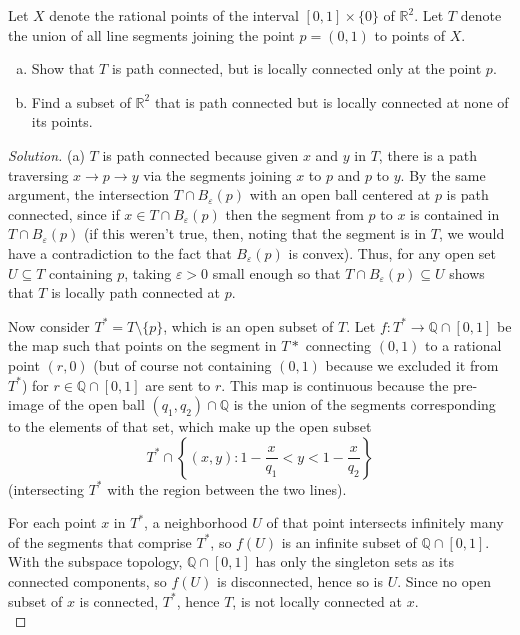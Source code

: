 \documentclass[10pt]{article}
\providecommand{\eps}{\varepsilon}
\providecommand{\QQ}{\mathbb Q}
\providecommand{\RR}{\mathbb R}
\providecommand{\ii}{\item}
\newenvironment{soln}{\begin{proof}[Solution]}{\end{proof}}
\begin{document}
\pagebreak

\begin{problem}
    [Munkres 25.5]
    Let $X$ denote the rational points of the interval $[0,1]\times\{0\}$ of $\RR^2$.
    Let $T$ denote the union of all line segments joining the point $p=(0,1)$
    to points of $X$.
    \begin{enumerate}[(a)]
        \ii Show that $T$ is path connected,
	but is locally connected only at the point $p$.
	\ii Find a subset of $\RR^2$ that is path connected
	but is locally connected at none of its points.
    \end{enumerate}
\end{problem}

\begin{soln}
    (a) $T$ is path connected because
    given $x$ and $y$ in $T$, there is a path traversing $x\to p\to y$
    via the segments joining $x$ to $p$ and $p$ to $y$.
    By the same argument, the intersection $T\cap B_\eps(p)$
    with an open ball centered at $p$ is path connected,
    since if $x\in T\cap B_\eps(p)$ then the segment from $p$ to $x$
    is contained in $T\cap B_\eps(p)$ (if this weren't true,
    then, noting that the segment is in $T$, we would have
    a contradiction to the fact that $B_\eps(p)$ is convex).
    Thus, for any open set $U\subseteq T$ containing $p$,
    taking $\eps>0$ small enough so that $T\cap B_\eps(p)\subseteq U$
    shows that $T$ is locally path connected at $p$.

    Now consider $T^* = T\setminus \{p\}$, which is an open subset of $T$.
    Let $f\colon T^*\to\QQ\cap[0,1]$ be the map such that
    points on the segment in $T*$ connecting $(0,1)$ to a rational point $(r,0)$
    (but of course not containing $(0,1)$ because we excluded it from $T^*$)
    for $r\in\QQ\cap[0,1]$ are sent to $r$.
    This map is continuous because the pre-image of the open ball
    $(q_1,q_2)\cap\QQ$ is the union of the segments corresponding to
    the elements of that set, which make up the open subset
    \begin{equation*}
	T^*\cap\left\{(x,y): 1 - \frac{x}{q_1} < y < 1 - \frac{x}{q_2}\right\}
    \end{equation*}
    (intersecting $T^*$ with the region between the two lines).

    For each point $x$ in $T^*$, a neighborhood $U$ of that point intersects
    infinitely many of the segments that comprise $T^*$,
    so $f(U)$ is an infinite subset of $\QQ\cap[0,1]$.
    With the subspace topology, $\QQ\cap[0,1]$ has only the singleton sets
    as its connected components, so $f(U)$ is disconnected, hence so is $U$.
    Since no open subset of $x$ is connected, $T^*$, hence $T$,
    is not locally connected at $x$.
    \\


\end{soln}
\end{document}
